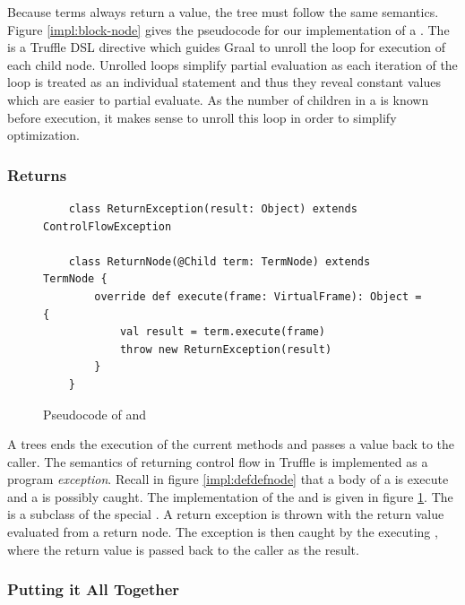 Because terms always return a value, the  tree must follow the same semantics.
Figure \ref{impl:block-node} gives the pseudocode for our implementation of a .
The  is a Truffle DSL directive which guides Graal to unroll\cite{loop-unrolling} the loop for execution of each child node.
Unrolled loops simplify partial evaluation as each iteration of the loop is treated as an individual statement and thus they reveal constant values which are easier to partial evaluate.
As the number of children in a  is known before execution, it makes sense to unroll this loop in order to simplify optimization.

\subsubsection*{Returns}

\begin{figure}[!htb]
	\begin{verbatim}
	class ReturnException(result: Object) extends ControlFlowException
	
	class ReturnNode(@Child term: TermNode) extends TermNode {
		override def execute(frame: VirtualFrame): Object = { 
			val result = term.execute(frame)
			throw new ReturnException(result)
		}
	}
	\end{verbatim}
	\caption{Pseudocode of  and }
	\label{impl:return}
\end{figure}

A  trees ends the execution of the current methods and passes a value back to the caller.
The semantics of returning control flow in Truffle is implemented as a program \textit{exception}.
Recall in figure \ref{impl:defdefnode} that a body of a  is execute and a  is possibly caught.
The implementation of the  and  is given in figure \ref{impl:return}.
The  is a subclass of the special . 
A return exception is thrown with the return value evaluated from a return node.
The exception is then caught by the executing , where the return value is passed back to the caller as the result. 

 \subsubsection*{Putting it All Together}

